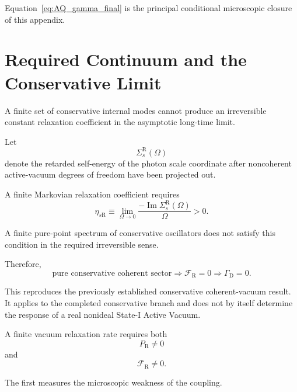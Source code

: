 Equation~\eqref{eq:AQ_gamma_final} is the principal conditional microscopic
closure of this appendix.


\section{Required Continuum and the Conservative Limit}

A finite set of conservative internal modes cannot produce an irreversible
constant relaxation coefficient in the asymptotic long-time limit.

Let
\begin{equation}
    \Sigma_s^{\mathrm R}(\Omega)
\end{equation}
denote the retarded self-energy of the photon scale coordinate after
noncoherent active-vacuum degrees of freedom have been projected out.

A finite Markovian relaxation coefficient requires
\begin{equation}
    \boxed{
    \eta_{s\mathrm R}
    \equiv
    \lim_{\Omega\rightarrow0}
    \frac{
        -\operatorname{Im}
        \Sigma_s^{\mathrm R}(\Omega)
    }{
        \Omega
    }
    >
    0.
    }
    \label{eq:AQ_ohmic_condition}
\end{equation}

A finite pure-point spectrum of conservative oscillators does not satisfy this
condition in the required irreversible sense.

Therefore,
\begin{equation}
    \boxed{
    \text{pure conservative coherent sector}
    \Longrightarrow
    \mathcal F_{\mathrm R}=0
    \Longrightarrow
    \Gamma_{\mathrm D}=0.
    }
    \label{eq:AQ_conservative_limit}
\end{equation}

This reproduces the previously established conservative coherent-vacuum
result. It applies to the completed conservative branch and does not by itself
determine the response of a real nonideal State-I Active Vacuum.

A finite vacuum relaxation rate requires both
\begin{equation}
    P_{\mathrm R}\neq0
\end{equation}
and
\begin{equation}
    \mathcal F_{\mathrm R}\neq0.
\end{equation}

The first measures the microscopic weakness of the coupling.

